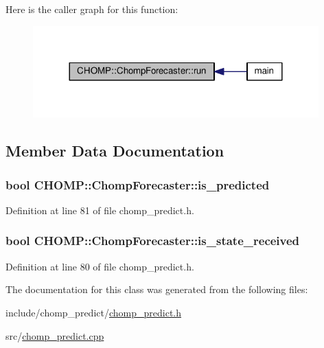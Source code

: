 Here is the caller graph for this function\+:
\nopagebreak
\begin{figure}[H]
\begin{center}
\leavevmode
\includegraphics[width=312pt]{class_c_h_o_m_p_1_1_chomp_forecaster_af225bf2af3fede364b922e27be410f0b_icgraph}
\end{center}
\end{figure}




\subsection{Member Data Documentation}
\subsubsection[{\texorpdfstring{is\+\_\+predicted}{is_predicted}}]{\setlength{\rightskip}{0pt plus 5cm}bool C\+H\+O\+M\+P\+::\+Chomp\+Forecaster\+::is\+\_\+predicted}\hypertarget{class_c_h_o_m_p_1_1_chomp_forecaster_ae092aa988e2587db915e287fc3fa0aff}{}\label{class_c_h_o_m_p_1_1_chomp_forecaster_ae092aa988e2587db915e287fc3fa0aff}


Definition at line 81 of file chomp\+\_\+predict.\+h.

\subsubsection[{\texorpdfstring{is\+\_\+state\+\_\+received}{is_state_received}}]{\setlength{\rightskip}{0pt plus 5cm}bool C\+H\+O\+M\+P\+::\+Chomp\+Forecaster\+::is\+\_\+state\+\_\+received}\hypertarget{class_c_h_o_m_p_1_1_chomp_forecaster_ae642d133970543c83eebd153d74e8459}{}\label{class_c_h_o_m_p_1_1_chomp_forecaster_ae642d133970543c83eebd153d74e8459}


Definition at line 80 of file chomp\+\_\+predict.\+h.



The documentation for this class was generated from the following files\+:\begin{DoxyCompactItemize}
\item 
include/chomp\+\_\+predict/\hyperlink{chomp__predict_8h}{chomp\+\_\+predict.\+h}\item 
src/\hyperlink{chomp__predict_8cpp}{chomp\+\_\+predict.\+cpp}\end{DoxyCompactItemize}
